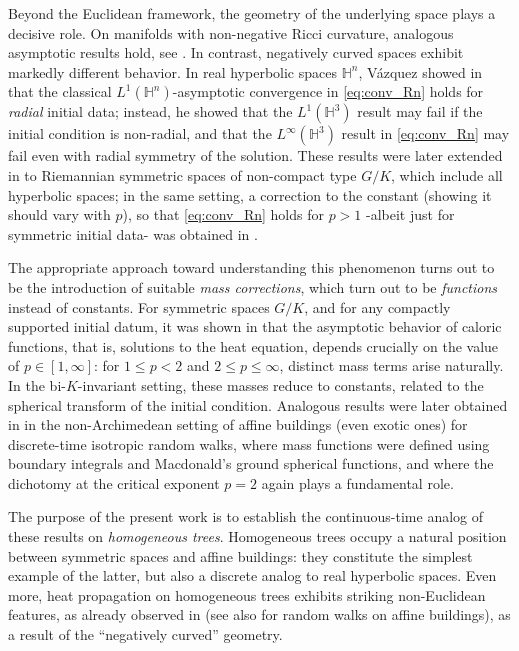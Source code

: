 \documentclass[10pt,a4paper]{amsart}
\theoremstyle{plain}
\theoremstyle{remark}
\theoremstyle{definition}
\begin{document}
Beyond the Euclidean framework, the geometry of the underlying space plays a decisive role. On manifolds with non-negative Ricci curvature, analogous asymptotic results hold, see \cite{GPZ}. In contrast, negatively curved spaces exhibit markedly different behavior. In real hyperbolic spaces $\mathbb{H}^n$, Vázquez showed in \cite{Vaz} that the classical $L^{1}(\mathbb{H}^n)$-asymptotic convergence in \eqref{eq:conv_Rn} holds for \textit{radial} initial data; instead, he showed that the $L^1(\mathbb{H}^3)$ result may fail if the initial condition is non-radial, and that the $L^{\infty}(\mathbb{H}^3)$ result in \eqref{eq:conv_Rn} may fail even with radial symmetry of the solution. These results were later extended in \cite{APZ} to Riemannian symmetric spaces of non-compact type $G/K$, which include all hyperbolic spaces; in the same setting, a correction to the constant (showing it should vary with $p$), so that \eqref{eq:conv_Rn} holds for $p>1$ -albeit just for symmetric initial data- was obtained in \cite{Naik}.

The appropriate approach toward understanding this phenomenon turns out to be the introduction of suitable \emph{mass corrections}, which turn out to be \textit{functions} instead of constants. For symmetric spaces $G/K$, and for any compactly supported initial datum, it was shown in \cite{P1} that the asymptotic behavior of caloric functions, that is, solutions to the heat equation, depends crucially on the value of $p\in[1,\infty]$: for $1\leq p<2$ and $2\leq p\leq\infty$, distinct mass terms arise naturally. In the bi-$K$-invariant setting, these masses reduce to constants, related to the spherical transform of the initial condition. Analogous results were later obtained in \cite{PT} in the non-Archimedean setting of affine buildings (even exotic ones) for discrete-time isotropic random walks, where mass functions were defined using boundary integrals and Macdonald's ground spherical functions, and where the dichotomy at the critical exponent $p=2$ again plays a fundamental role.

The purpose of the present work is to establish the continuous-time analog of these results on \emph{homogeneous trees}. Homogeneous trees occupy a natural position between symmetric spaces and affine buildings: they constitute the simplest example of the latter, but also a discrete analog to real hyperbolic spaces. Even more, heat propagation on homogeneous trees exhibits striking non-Euclidean features, as already observed in \cite{CMS, MedSe} (see also \cite{T} for random walks on affine buildings), as a result of the ``negatively curved'' geometry.
\end{document}
